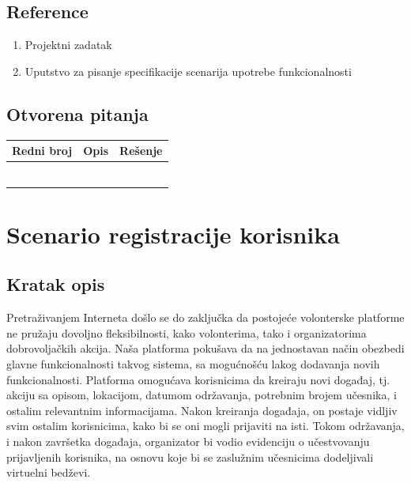 \documentclass[11pt,a4paper]{article}
\begin{document}
\subsection{Reference}
\begin{enumerate}
    \item Projektni zadatak
    \item Uputstvo za pisanje specifikacije scenarija upotrebe funkcionalnosti
\end{enumerate}
\subsection{Otvorena pitanja}
\begin{center}
\begin{tabular}{| >{\centering\arraybackslash}m{39mm} | >{\centering\arraybackslash}m{39mm} | >{\centering\arraybackslash}m{39mm} |}
\hline
\rowcolor[HTML]{000000} 
{\color[HTML]{FFFFFF} Redni broj } & {\color[HTML]{FFFFFF} Opis } & {\color[HTML]{FFFFFF} Rešenje } \\ \hline
 &  & \\ \hline
 &  &  \\ \hline
 &  &  \\ \hline
 &  &  \\ \hline
 &  &  \\ \hline
 &  &  \\ \hline
\end{tabular}
\end{center}

\newpage

\section{Scenario registracije korisnika}
\subsection{Kratak opis}
Pretraživanjem Interneta došlo se do zaključka da postojeće volonterske platforme ne pružaju dovoljno fleksibilnosti, kako volonterima, tako i organizatorima dobrovoljačkih akcija. Naša platforma pokušava da na jednostavan način obezbedi glavne funkcionalnosti takvog sistema, sa mogućnošću lakog dodavanja novih funkcionalnosti. Platforma omogućava korisnicima da kreiraju novi događaj, tj. akciju sa opisom, lokacijom, datumom održavanja, potrebnim brojem učesnika, i ostalim relevantnim informacijama. Nakon kreiranja događaja, on postaje vidljiv svim ostalim korisnicima, kako bi se oni mogli prijaviti na isti. Tokom održavanja, i nakon završetka događaja, organizator bi vodio evidenciju o učestvovanju prijavljenih korisnika, na osnovu koje bi se zaslužnim učesnicima dodeljivali virtuelni bedževi.
\end{document}
